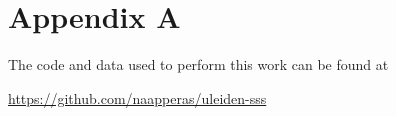 \appendix

\section{Appendix A}

The code and data used to perform this work can be found at
\begin{center}
    \href{https://github.com/Naapperas/uleiden-sss/tree/main/assignments/2}{https://github.com/naapperas/uleiden-sss}
\end{center}

